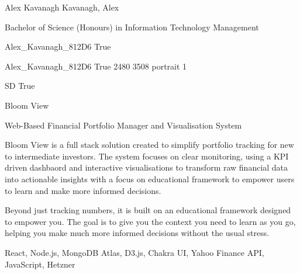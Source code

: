 
\begingroup{}\relax



\def\Key{Alex_Kavanagh_812D6}

{Alex Kavanagh}
{Kavanagh, Alex}

{Bachelor of Science (Honours) in Information Technology Management}

{Alex_Kavanagh_812D6}
{True}

{Alex_Kavanagh_812D6}
{True}
{2480}
{3508}
{portrait}
{1}

{SD}
{True}

{Bloom View}

{Web-Based Financial Portfolio Manager and Visualisation System}

{Bloom View is a full stack solution created to simplify portfolio tracking for new to intermediate investors. The system focuses on clear monitoring, using a KPI driven dashbaord and interactive visualisations to transform raw financial data into actionable insights with a focus on educational framework to empower users to learn and make more informed decisions. 

Beyond just tracking numbers, it is built on an educational framework designed to empower you. The goal is to give you the context you need to learn as you go, helping you make much more informed decisions without the usual stress.}

{React, Node.js, MongoDB Atlas, D3.js, Chakra UI, Yahoo Finance API, JavaScript, Hetzner}

